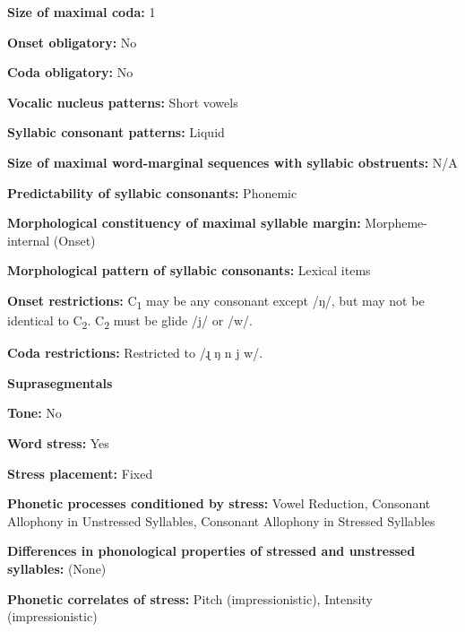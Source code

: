 \textbf{Size of maximal coda:} 1



\textbf{Onset obligatory:} No



\textbf{Coda obligatory:} No



\textbf{Vocalic nucleus patterns:} Short vowels



\textbf{Syllabic consonant patterns:} Liquid



\textbf{Size of maximal word{}-marginal sequences with syllabic obstruents:} N/A



\textbf{Predictability of syllabic consonants:} Phonemic



\textbf{Morphological constituency of maximal syllable margin:} Morpheme-internal (Onset)



\textbf{Morphological pattern of syllabic consonants:} Lexical items



\textbf{Onset restrictions:} C\textsubscript{1} may be any consonant except /ŋ/, but may not be identical to C\textsubscript{2}. C\textsubscript{2} must be glide /j/ or /w/. 



\textbf{Coda restrictions:} Restricted to /ɻ ŋ n j w/.



\textbf{Suprasegmentals}



\textbf{Tone:} No



\textbf{Word stress:} Yes



\textbf{Stress placement:} Fixed



\textbf{Phonetic processes conditioned by stress:} Vowel Reduction, Consonant Allophony in Unstressed Syllables, Consonant Allophony in Stressed Syllables



\textbf{Differences in phonological properties of stressed and unstressed syllables:} (None)



\textbf{Phonetic correlates of stress:} Pitch (impressionistic), Intensity (impressionistic)



